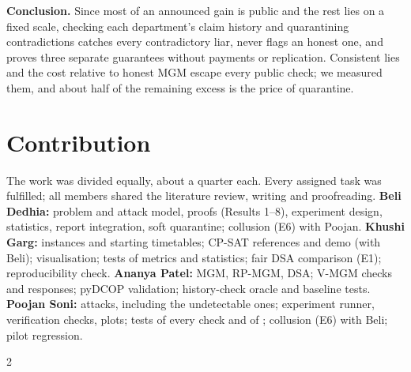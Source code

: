 \documentclass{article}
\theoremstyle{definition}
\newcommand{\1}{\mathbf{1}}
\begin{document}
\textbf{Conclusion.} Since most of an announced gain is public and the rest lies on a fixed scale, checking each department's claim history and quarantining contradictions catches every contradictory liar, never flags an honest one, and proves three separate guarantees without payments or replication. Consistent lies and the cost relative to honest MGM escape every public check; we measured them, and about half of the remaining excess is the price of quarantine.

\section{Contribution}
The work was divided equally, about a quarter each. Every assigned task was fulfilled; all members shared the literature review, writing and proofreading.
\textbf{Beli Dedhia:} problem and attack model, proofs (Results 1--8), experiment design, statistics, report integration, soft quarantine; collusion (E6) with Poojan. \textbf{Khushi Garg:} instances and starting timetables; CP-SAT references and demo (with Beli); visualisation; tests of metrics and statistics; fair DSA comparison (E1); reproducibility check. \textbf{Ananya Patel:} MGM, RP-MGM, DSA; V-MGM checks and responses; pyDCOP validation; history-check oracle and baseline tests. \textbf{Poojan Soni:} attacks, including the undetectable ones; experiment runner, verification checks, plots; tests of every check and of ; collusion (E6) with Beli; pilot regression.

{\scriptsize\setlength{\bibsep}{0pt}\setlength{\columnsep}{12pt}
\begin{multicols}{2}


\end{multicols}}
\end{document}
